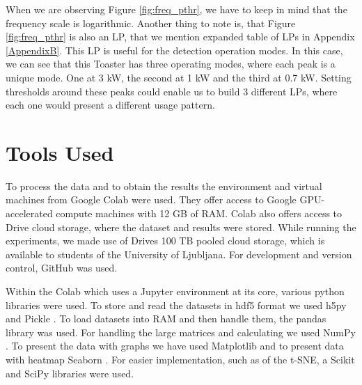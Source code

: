 When we are observing Figure \ref{fig:freq_pthr}, we have to keep in mind that the frequency scale is logarithmic.
Another thing to note is, that Figure \ref{fig:freq_pthr} is also an LP, that we mention expanded table of LPs in Appendix \ref{AppendixB}.
This LP is useful for the detection operation modes.
In this case, we can see that this Toaster has three operating modes, where each peak is a unique mode.
One at 3 kW, the second at 1 kW and the third at 0.7 kW.
Setting thresholds around these peaks could enable us to build 3 different LPs, where each one would present a different usage pattern.

\section{Tools Used}

To process the data and to obtain the results the environment and virtual machines from Google Colab \cite{colab} were used.
They offer access to Google GPU-accelerated compute machines with 12 GB of RAM. 
Colab also offers access to Drive cloud storage, where the dataset and results were stored.
While running the experiments, we made use of Drives 100 TB pooled cloud storage, which is available to students of the University of Ljubljana. 
For development and version control, GitHub was used. 

Within the Colab which uses a Jupyter \cite{jupyter} environment at its core, various python libraries were used.
To store and read the datasets in hdf5 format we used h5py  \cite{hdf5} and Pickle  \cite{pickle}.
To load datasets into RAM and then handle them, the pandas  \cite{pandas} library was used.
For handling the large matrices and calculating we used NumPy  \cite{numpy}.
To present the data with graphs we have used Matplotlib  \cite{matplotlib} and to present data with heatmap Seaborn  \cite{seaborn}.
For easier implementation, such as of the t-SNE, a Scikit  \cite{scikit} and SciPy  \cite{scipy} libraries were used.

